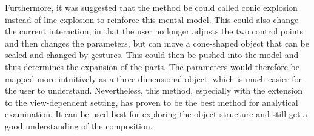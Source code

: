 Furthermore, it was suggested that the method be could called conic explosion instead of line explosion to reinforce this mental model. This could also change the current interaction, in that the user no longer adjusts the two control points and then changes the parameters, but can move a cone-shaped object that can be scaled and changed by gestures. This could then be pushed into the model and thus determines the expansion of the parts. The parameters would therefore be mapped more intuitively as a three-dimensional object, which is much easier for the user to understand. Nevertheless, this method, especially with the extension to the view-dependent setting, has proven to be the best method for analytical examination. It can be used best for exploring the object structure and still get a good understanding of the composition.

